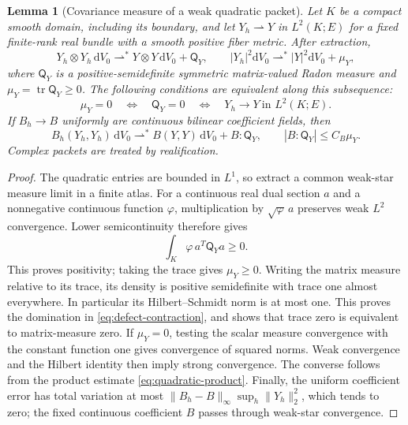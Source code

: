 \documentclass[11pt]{article}
\numberwithin{equation}{section}
\newtheorem{lemma}[lemma]{Lemma}
\theoremstyle{definition}
\theoremstyle{remark}
\newcommand{\dd}{\mathrm d}
\newcommand{\norm}[1]{\lVert#1\rVert}
\newcommand{\dV}{\dd V}
\begin{document}
\begin{lemma}[Covariance measure of a weak quadratic packet]
\label{lem:positive-packet-defect}
Let $K$ be a compact smooth domain, including its boundary, and let
$Y_h\rightharpoonup Y$ in $L^2(K;E)$ for a fixed finite-rank real bundle with
a smooth positive fiber metric.  After extraction,
\begin{equation}
 Y_h\otimes Y_h\,\dV_0\rightharpoonup^*
 Y\otimes Y\,\dV_0+\mathsf Q_Y,
 \qquad
 |Y_h|^2\dV_0\rightharpoonup^*|Y|^2\dV_0+\mu_Y,
 \label{eq:positive-packet-defect}
\end{equation}
where $\mathsf Q_Y$ is a positive-semidefinite symmetric matrix-valued
Radon measure and $\mu_Y=\operatorname{tr}\mathsf Q_Y\ge0$.
The following conditions are equivalent along this subsequence:
\begin{equation}
 \mu_Y=0
 \quad\Longleftrightarrow\quad \mathsf Q_Y=0
 \quad\Longleftrightarrow\quad Y_h\to Y\ \text{in }L^2(K;E).
 \label{eq:positive-defect-equivalence}
\end{equation}
If $B_h\to B$ uniformly are continuous bilinear coefficient fields, then
\begin{equation}
 B_h(Y_h,Y_h)\,\dV_0\rightharpoonup^*
 B(Y,Y)\,\dV_0+B:\mathsf Q_Y,
 \qquad |B:\mathsf Q_Y|\le C_B\mu_Y.
 \label{eq:defect-contraction}
\end{equation}
Complex packets are treated by realification.
\end{lemma}
\begin{proof}
The quadratic entries are bounded in $L^1$, so extract a common weak-star
measure limit in a finite atlas.  For a continuous real dual section $a$
and a nonnegative continuous function $\varphi$, multiplication by
$\sqrt\varphi\,a$ preserves weak $L^2$ convergence.  Lower semicontinuity
therefore gives
\[
 \int_K\varphi\,a^T\mathsf Q_Ya\ge0.
\]
This proves positivity; taking the trace gives $\mu_Y\ge0$.
Writing the matrix measure relative to its trace, its density is
positive semidefinite with trace one almost everywhere.  In particular
its Hilbert--Schmidt norm is at most one.  This proves the domination in
\eqref{eq:defect-contraction}, and shows that trace zero is equivalent to
matrix-measure zero.  If $\mu_Y=0$, testing the scalar measure convergence
with the constant function one gives convergence of squared norms.
Weak convergence and the Hilbert identity then imply strong convergence.
The converse follows from the product estimate \eqref{eq:quadratic-product}.
Finally, the uniform coefficient error has total variation at most
$\norm{B_h-B}_\infty\sup_h\norm{Y_h}_2^2$, which tends to zero; the
fixed continuous coefficient $B$ passes through weak-star convergence.
\end{proof}
\end{document}
